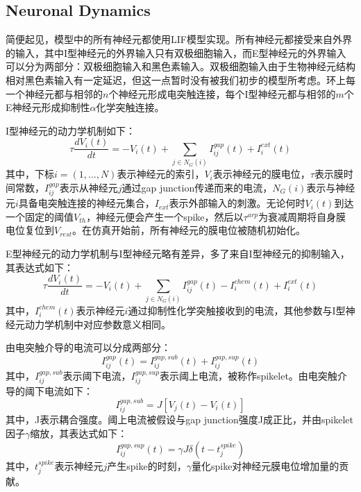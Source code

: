 \documentclass[lang=cn,11pt,a4paper,cite=numbers]{elegantpaper}
\begin{document}
\subsection{Neuronal Dynamics}
  简便起见，模型中的所有神经元都使用LIF模型实现。所有神经元都接受来自外界的输入，其中I型神经元的外界输入只有双极细胞输入，而E型神经元的外界输入可以分为两部分：双极细胞输入和黑色素输入。双极细胞输入由于生物神经元结构相对黑色素输入有一定延迟，但这一点暂时没有被我们初步的模型所考虑。环上每一个神经元都与相邻的$n$个神经元形成电突触连接，每个I型神经元都与相邻的$m$个E神经元形成抑制性$\alpha$化学突触连接。

  I型神经元的动力学机制如下：
\begin{equation}
    {\tau}\frac{dV_{i}(t)}{dt} = -V_{i}(t) + \sum_{j \in N_{G}(i)}I_{ij}^{gap}(t) + I_{i}^{ext}(t)
\end{equation}
其中，下标$i = (1,...,N)$表示神经元的索引，$V_{i}$表示神经元的膜电位，$\tau$表示膜时间常数，$I_{ij}^{gap}$表示从神经元$j$通过gap junction传递而来的电流，$N_{G}(i)$表示与神经元$i$具备电突触连接的神经元集合，$I_{ext}$表示外部输入的刺激。无论何时$V_{i}(t)$到达一个固定的阈值$V_{th}$，神经元便会产生一个spike，然后以$\tau^{arp}$为衰减周期将自身膜电位复位到$V_{rest}$。在仿真开始前，所有神经元的膜电位被随机初始化。

  E型神经元的动力学机制与I型神经元略有差异，多了来自I型神经元的抑制输入，其表达式如下：
\begin{equation}
    {\tau}\frac{dV_{i}(t)}{dt} = -V_{i}(t) + \sum_{j \in N_{G}(i)}I_{ij}^{gap}(t) - I_{i}^{chem}(t) + I_{i}^{ext}(t)
\end{equation}
其中，$I_{i}^{chem}(t)$表示神经元$i$通过抑制性化学突触接收到的电流，其他参数与I型神经元动力学机制中对应参数意义相同。

  由电突触介导的电流可以分成两部分：
\begin{equation}
    I_{ij}^{gap}(t) = I_{ij}^{gap,sub}(t) + I_{ij}^{gap,sup}(t)
\end{equation}
其中，$I_{ij}^{gap,sub}$表示阈下电流，$I_{ij}^{gap,sup}$表示阈上电流，被称作spikelet。由电突触介导的阈下电流如下：
\begin{equation}
    I_{ij}^{gap,sub} = J\left[V_{j}(t) - V_{i}(t)\right]
\end{equation}
其中，J表示耦合强度。阈上电流被假设与gap junction强度J成正比，并由spikelet因子$\gamma$缩放，其表达式如下：
\begin{equation}
    I_{ij}^{gap,sup}(t) = {\gamma}J\delta(t - t_{j}^{spike})
\end{equation}
其中，$t_{j}^{spike}$表示神经元$j$产生spike的时刻，$\gamma$量化spike对神经元膜电位增加量的贡献。
\end{document}
